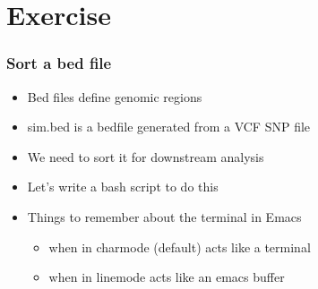 \documentclass[t,10pt]{beamer}
\begin{document}
\section{Exercise}
\label{sec-5}
\begin{frame}
\frametitle{Sort a bed file}
\label{sec-5-1}


\begin{itemize}
\item Bed files define genomic regions
\end{itemize}
\vspace{0.25in}
\begin{itemize}
\item sim.bed is a bedfile generated from a VCF SNP file
\end{itemize}
\vspace{0.25in}
\begin{itemize}
\item We need to sort it for downstream analysis
\end{itemize}
\vspace{0.25in}
\begin{itemize}
\item Let's write a bash script to do this
\end{itemize}
\vspace{0.25in}
\begin{itemize}
\item Things to remember about the terminal in Emacs
\begin{itemize}
\item when in charmode (default) acts like a terminal
\item when in linemode acts like an emacs buffer
\end{itemize}
\end{itemize}
\end{frame}
\end{document}
